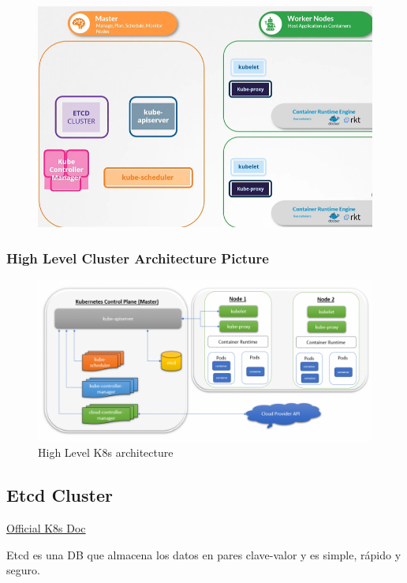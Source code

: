 \documentclass{article}
\begin{document}
\begin{figure}[H]
    \includegraphics[scale=0.5]{pictures/image.png}
\end{figure}

\subsubsection{High Level Cluster Architecture Picture}

\begin{figure}[H]
    \centering
    \includegraphics[width=\textwidth]{pictures/image1.png}
    \caption{High Level K8s architecture}
    \label{hlk8s}
\end{figure}

\subsection{Etcd Cluster}

\href{https://kubernetes.io/docs/tasks/administer-cluster/configure-upgrade-etcd/}{Official K8s Doc}

Etcd es una DB que almacena los datos en pares clave-valor y es simple, rápido y seguro.
\end{document}
